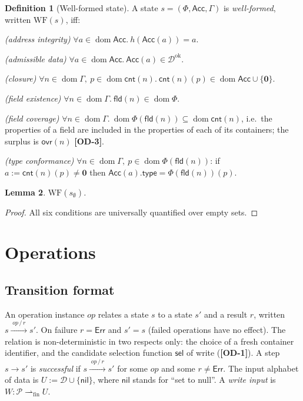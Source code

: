 \documentclass[11pt,a4paper]{article}
\theoremstyle{definition}
\newtheorem{definition}{Definition}[section]
\theoremstyle{plain}
\newtheorem{lemma}[definition]{Lemma}
\theoremstyle{remark}
\newcommand{\od}[1]{\textsf{\textbf{\textcolor{BrickRed}{[OD-#1]}}}}
\newcommand{\Dat}{\mathcal{D}}
\newcommand{\Prp}{\mathcal{P}}
\newcommand{\nul}{\mathbf{0}}
\newcommand{\nil}{\mathsf{nil}}
\newcommand{\Err}{\mathsf{Err}}
\newcommand{\pfin}{\rightharpoonup_{\mathrm{fin}}}
\newcommand{\dom}{\operatorname{dom}}
\newcommand{\fld}{\mathsf{fld}}
\newcommand{\cnt}{\mathsf{cnt}}
\newcommand{\ovr}{\mathsf{ovr}}
\newcommand{\Acc}{\mathsf{Acc}}
\newcommand{\sel}{\mathsf{sel}}
\newcommand{\tr}[2]{\xrightarrow{\;#1\,/\,#2\;}}
\begin{document}
\begin{definition}[Well-formed state]\label{def:wf}
A state $s=(\Phi,\Acc,\Gamma)$ is \emph{well-formed}, written $\mathrm{WF}(s)$, iff:
\begin{description}[leftmargin=1.2cm,labelwidth=1cm,font=\bfseries]
\item[WF1] \emph{(address integrity)} $\forall a\in\dom\Acc.\ h(\Acc(a))=a$.
\item[WF2] \emph{(admissible data)} $\forall a\in\dom\Acc.\ \Acc(a)\in\Dat^{\mathrm{ok}}$.
\item[WF3] \emph{(closure)} $\forall n\in\dom\Gamma,\ p\in\dom\cnt(n).\ \cnt(n)(p)\in\dom\Acc\cup\{\nul\}$.
\item[WF4] \emph{(field existence)} $\forall n\in\dom\Gamma.\ \fld(n)\in\dom\Phi$.
\item[WF5] \emph{(field coverage)} $\forall n\in\dom\Gamma.\ \dom\Phi(\fld(n))\subseteq\dom\cnt(n)$, i.e.\ the properties of a field are included in the properties of each of its containers; the surplus is $\ovr(n)$ \od{3}.
\item[WF6] \emph{(type conformance)} $\forall n\in\dom\Gamma,\ p\in\dom\Phi(\fld(n))$: if $a:=\cnt(n)(p)\neq\nul$ then $\Acc(a).\mathsf{type}=\Phi(\fld(n))(p)$.
\end{description}
\end{definition}

\begin{lemma}
$\mathrm{WF}(s_\emptyset)$.
\end{lemma}
\begin{proof}
All six conditions are universally quantified over empty sets.
\end{proof}

\section{Operations}
\label{sec:ops}

\subsection{Transition format}
An operation instance $\mathit{op}$ relates a state $s$ to a state $s'$ and a result $r$,
written $s\tr{\mathit{op}}{r}s'$. On failure $r=\Err$ and $s'=s$ (failed operations have no effect).
The relation is non-deterministic in two respects only: the choice of a fresh container identifier,
and the candidate selection function $\sel$ of \textsf{write} (\od{1}).
A step $s\to s'$ is \emph{successful} if $s\tr{\mathit{op}}{r}s'$ for some $\mathit{op}$ and some $r\neq\Err$.
The input alphabet of data is $U:=\Dat\cup\{\nil\}$, where $\nil$ stands for ``set to null''.
A \emph{write input} is $W:\Prp\pfin U$.
\end{document}
